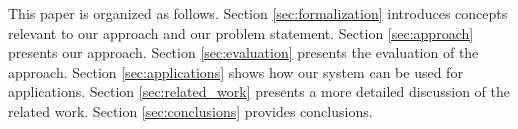 This paper is organized as follows.
Section \ref{sec:formalization} introduces concepts relevant to our approach and our problem statement. Section \ref{sec:approach} presents our approach. Section \ref{sec:evaluation} presents the evaluation of the approach. Section \ref{sec:applications} shows how our system can be used for applications. Section \ref{sec:related_work} presents a more detailed discussion of the related work. Section \ref{sec:conclusions} provides conclusions.




